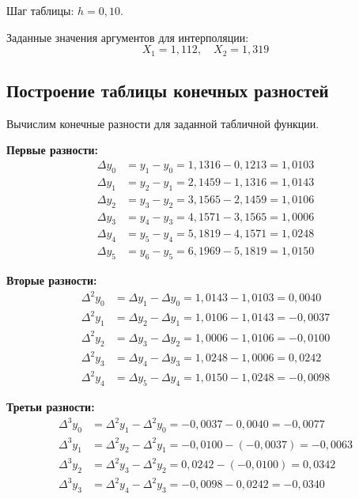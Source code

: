 Шаг таблицы: $h = 0{,}10$.

Заданные значения аргументов для интерполяции:
\[
X_1 = 1{,}112,\quad X_2 = 1{,}319
\]

\subsection{Построение таблицы конечных разностей}

Вычислим конечные разности для заданной табличной функции.

\textbf{Первые разности:}
\begin{align*}
\Delta y_0 &= y_1 - y_0 = 1{,}1316 - 0{,}1213 = 1{,}0103 \\
\Delta y_1 &= y_2 - y_1 = 2{,}1459 - 1{,}1316 = 1{,}0143 \\
\Delta y_2 &= y_3 - y_2 = 3{,}1565 - 2{,}1459 = 1{,}0106 \\
\Delta y_3 &= y_4 - y_3 = 4{,}1571 - 3{,}1565 = 1{,}0006 \\
\Delta y_4 &= y_5 - y_4 = 5{,}1819 - 4{,}1571 = 1{,}0248 \\
\Delta y_5 &= y_6 - y_5 = 6{,}1969 - 5{,}1819 = 1{,}0150
\end{align*}

\textbf{Вторые разности:}
\begin{align*}
\Delta^2 y_0 &= \Delta y_1 - \Delta y_0 = 1{,}0143 - 1{,}0103 = 0{,}0040 \\
\Delta^2 y_1 &= \Delta y_2 - \Delta y_1 = 1{,}0106 - 1{,}0143 = -0{,}0037 \\
\Delta^2 y_2 &= \Delta y_3 - \Delta y_2 = 1{,}0006 - 1{,}0106 = -0{,}0100 \\
\Delta^2 y_3 &= \Delta y_4 - \Delta y_3 = 1{,}0248 - 1{,}0006 = 0{,}0242 \\
\Delta^2 y_4 &= \Delta y_5 - \Delta y_4 = 1{,}0150 - 1{,}0248 = -0{,}0098
\end{align*}

\textbf{Третьи разности:}
\begin{align*}
\Delta^3 y_0 &= \Delta^2 y_1 - \Delta^2 y_0 = -0{,}0037 - 0{,}0040 = -0{,}0077 \\
\Delta^3 y_1 &= \Delta^2 y_2 - \Delta^2 y_1 = -0{,}0100 - (-0{,}0037) = -0{,}0063 \\
\Delta^3 y_2 &= \Delta^2 y_3 - \Delta^2 y_2 = 0{,}0242 - (-0{,}0100) = 0{,}0342 \\
\Delta^3 y_3 &= \Delta^2 y_4 - \Delta^2 y_3 = -0{,}0098 - 0{,}0242 = -0{,}0340
\end{align*}

